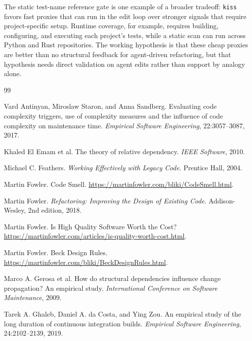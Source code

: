 \documentclass[11pt]{article}
\begin{document}
The static test-name reference gate is one example of a broader tradeoff:
\texttt{kiss} favors fast proxies that can run in the edit loop over stronger
signals that require project-specific setup.  Runtime coverage, for example,
requires building, configuring, and executing each project's tests, while a
static scan can run across Python and Rust repositories.  The working hypothesis
is that these cheap proxies are better than no structural feedback for
agent-driven refactoring, but that hypothesis needs direct validation on agent
edits rather than support by analogy alone.

\begin{thebibliography}{99}

Vard Antinyan, Miroslaw Staron, and Anna Sandberg.
\newblock Evaluating code complexity triggers, use of complexity measures and
the influence of code complexity on maintenance time.
\newblock \emph{Empirical Software Engineering}, 22:3057--3087, 2017.

Khaled El Emam et al.
\newblock The theory of relative dependency.
\newblock \emph{IEEE Software}, 2010.

Michael C. Feathers.
\newblock \emph{Working Effectively with Legacy Code}.
\newblock Prentice Hall, 2004.

Martin Fowler.
\newblock Code Smell.
\newblock \url{https://martinfowler.com/bliki/CodeSmell.html}.

Martin Fowler.
\newblock \emph{Refactoring: Improving the Design of Existing Code}.
\newblock Addison-Wesley, 2nd edition, 2018.

Martin Fowler.
\newblock Is High Quality Software Worth the Cost?
\newblock \url{https://martinfowler.com/articles/is-quality-worth-cost.html}.

Martin Fowler.
\newblock Beck Design Rules.
\newblock \url{https://martinfowler.com/bliki/BeckDesignRules.html}.

Marco A. Gerosa et al.
\newblock How do structural dependencies influence change propagation? An
empirical study.
\newblock \emph{International Conference on Software Maintenance}, 2009.

Tarek A. Ghaleb, Daniel A. da Costa, and Ying Zou.
\newblock An empirical study of the long duration of continuous integration
builds.
\newblock \emph{Empirical Software Engineering}, 24:2102--2139, 2019.


\end{thebibliography}
\end{document}
